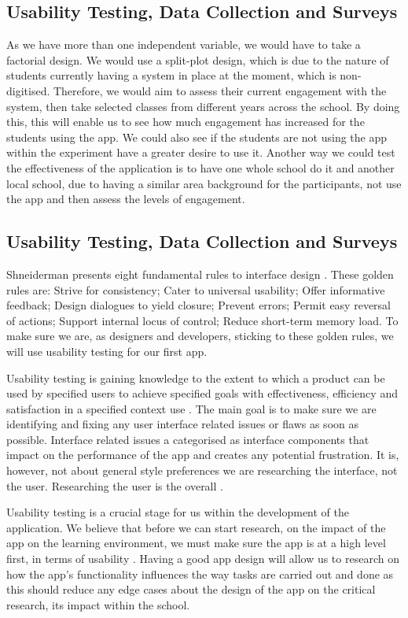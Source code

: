 \documentclass[sigchi]{acmart}
\begin{document}
\subsection{Usability Testing, Data Collection and Surveys}
As we have more than one independent variable, we would have to take a factorial design. We would use a split-plot design, which is due to the nature of students currently having a system in place at the moment, which is non-digitised. Therefore, we would aim to assess their current engagement with the system, then take selected classes from different years across the school. By doing this, this will enable us to see how much engagement has increased for the students using the app. We could also see if the students are not using the app within the experiment have a greater desire to use it. Another way we could test the effectiveness of the application is to have one whole school do it and another local school, due to having a similar area background for the participants, not use the app and then assess the levels of engagement.

\subsection{Usability Testing, Data Collection and Surveys}
Shneiderman presents eight fundamental rules to interface design \cite{shneiderman2016designing}. These golden rules are: Strive for consistency; Cater to universal usability; Offer informative feedback; Design dialogues to yield closure; Prevent errors; Permit easy reversal of actions; Support internal locus of control; Reduce short-term memory load. To make sure we are, as designers and developers, sticking to these golden rules, we will use usability testing for our first app.

Usability testing is gaining knowledge to the extent to which a product can be used by specified users to achieve specified goals with effectiveness, efficiency and satisfaction in a specified context use \cite{bevan2001proposed}. The main goal is to make sure we are identifying and fixing any user interface related issues or flaws as soon as possible. Interface related issues a categorised as interface components that impact on the performance of the app and creates any potential frustration. It is, however, not about general style preferences we are researching the interface, not the user. Researching the user is the overall  \cite{HCIusability}.  

Usability testing is a crucial stage for us within the development of the application. We believe that before we can start research, on the impact of the app on the learning environment, we must make sure the app is at a high level first, in terms of usability \cite{lazar2017research}. Having a good app design will allow us to research on how the app's functionality influences the way tasks are carried out and done as this should reduce any edge cases about the design of the app on the critical research, its impact within the school. 
\end{document}
